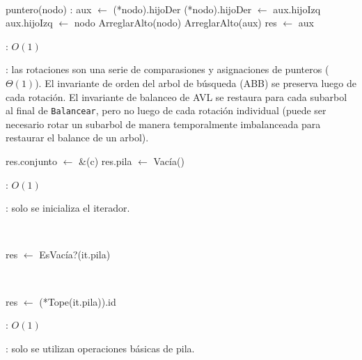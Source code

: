 \begin{Algoritmos}
	~

	\begin{algorithm}[H]
		\NoCaptionOfAlgo
		\caption{}
		\BlankLine
		puntero(nodo) : aux $\leftarrow$ (*nodo).hijoDer
		(*nodo).hijoDer $\leftarrow$ aux.hijoIzq
		aux.hijoIzq $\leftarrow$ nodo
		ArreglarAlto(nodo)
		ArreglarAlto(aux)
		res $\leftarrow$ aux
	\end{algorithm}
	
	\complejidad: $O(1)$

	\justifcomp: las rotaciones son una serie de comparasiones y asignaciones de punteros ($\Theta(1)$). El invariante de orden del arbol de búsqueda (ABB) se preserva luego de cada rotación. El invariante de balanceo de AVL se restaura para cada subarbol al final de \texttt{Balancear}, pero no luego de cada rotación individual (puede ser necesario rotar un subarbol de manera temporalmente imbalanceada para restaurar el balance de un arbol).


	\begin{algorithm}[H]
		\NoCaptionOfAlgo
		\caption{}
		res.conjunto $\leftarrow$ \&(c)
		res.pila $\leftarrow$ Vacía()
	\end{algorithm}

	\complejidad: $O(1)$

	\justifcomp: solo se inicializa el iterador.

	~

	\begin{algorithm}[H]
		\NoCaptionOfAlgo
		\caption{}
		res $\leftarrow$ EsVacía?(it.pila)
	\end{algorithm}

	~

	\begin{algorithm}[H]
		\NoCaptionOfAlgo
		\caption{}
		res $\leftarrow$ (*Tope(it.pila)).id
	\end{algorithm}

	\complejidad: $O(1)$

	\justifcomp: solo se utilizan operaciones básicas de pila.


\end{Algoritmos}
